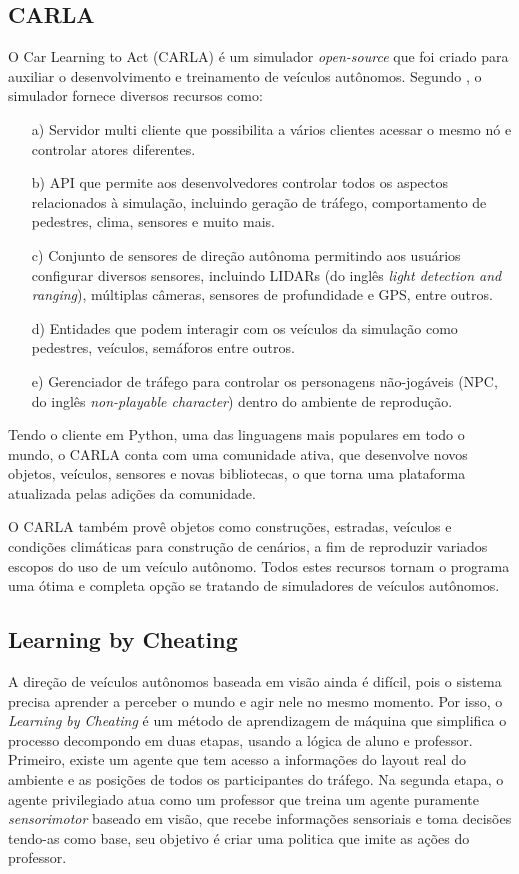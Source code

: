 \documentclass[a4paper,12pt,Times]{article}
\begin{document}
\subsection{CARLA}

O Car Learning to Act (CARLA) é um simulador \textit{open-source} que foi criado para auxiliar o desenvolvimento e treinamento de veículos autônomos. Segundo ,
o simulador fornece diversos recursos como:

\begin{itemize}
    \item[a)] Servidor multi cliente que possibilita a vários clientes acessar o mesmo nó e controlar atores diferentes.
    \item[b)] API que permite aos desenvolvedores controlar todos os aspectos relacionados à simulação, incluindo geração de tráfego, comportamento de pedestres, clima, sensores e muito mais.
    \item[c)] Conjunto de sensores de direção autônoma permitindo aos usuários configurar diversos sensores, incluindo LIDARs (do inglês \textit{light detection and ranging}), múltiplas câmeras, sensores de profundidade e GPS, entre outros.
    \item[d)] Entidades que podem interagir com os veículos da simulação como pedestres, veículos, semáforos entre outros.
    \item[e)] Gerenciador de tráfego para controlar os personagens não-jogáveis (NPC, do inglês \textit{non-playable character}) dentro do ambiente de reprodução.
\end{itemize}

Tendo o cliente em Python, uma das linguagens mais populares em todo o mundo, o CARLA conta com uma comunidade ativa, que desenvolve novos objetos, veículos, sensores e novas bibliotecas, o que torna uma plataforma atualizada pelas adições da comunidade.

O CARLA também provê objetos como construções, estradas, veículos e condições climáticas para construção de cenários, a fim de reproduzir variados escopos do uso de um veículo autônomo. Todos estes recursos tornam o programa uma ótima e completa opção se tratando de simuladores de veículos autônomos.

\subsection{Learning by Cheating}

A direção de veículos autônomos baseada em visão ainda é difícil, pois o sistema precisa aprender a perceber o mundo e agir nele no mesmo momento. Por isso, o \textit{Learning by Cheating} é um método de aprendizagem de máquina que simplifica o processo decompondo em duas etapas, usando a lógica de aluno e professor. Primeiro, existe um agente que tem acesso a informações do layout real do ambiente e as posições de todos os participantes do tráfego. Na segunda etapa, o agente privilegiado atua como um professor que treina um agente puramente \textit{sensorimotor} baseado em visão, que recebe informações sensoriais e toma decisões tendo-as como base, seu objetivo é criar uma politica que imite as ações do professor.
 
\end{document}
